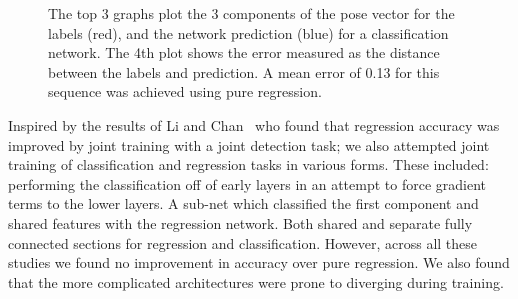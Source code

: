 \documentclass[11pt]{article} %
\begin{document}
\begin{figure}
\centering
{}%
\qquad
{}%
\caption{The top 3 graphs plot the 3 components of the pose vector for the labels (red), and the network prediction (blue) for a classification network. The 4th plot shows the error measured as the distance between the labels and prediction. A mean error of 0.13 for this sequence was achieved using pure regression.  }
\label{fig:classesRes}
\end{figure}

Inspired by the results of Li and Chan~\cite{Li2014} who found that regression accuracy was improved by joint training with a joint detection task; we also attempted joint training of classification and regression tasks in various forms. These included: performing the classification off of early layers in an attempt to force gradient terms to the lower layers. A sub-net which classified the first component and shared features with the regression network. Both shared and separate fully connected sections for regression and classification. However, across all these studies we found no improvement in accuracy over pure regression. We also found that the more complicated architectures were prone to diverging during training. 
\end{document}
